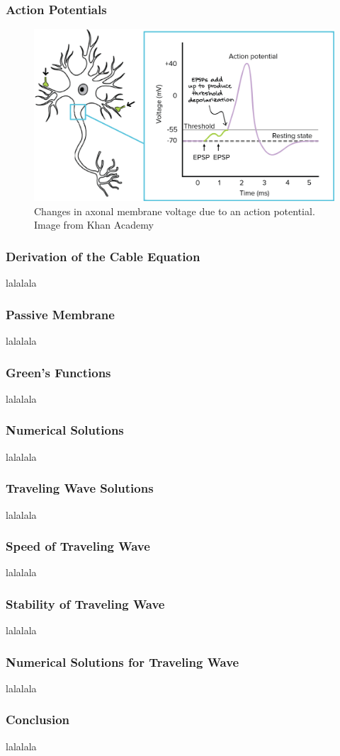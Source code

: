 \documentclass{beamer}
\begin{document}
\begin{frame}
\begin{columns}
\begin{column}{.5\textwidth}
    \end{column}
  \end{columns}
\end{frame}

\begin{frame}
\frametitle{Action Potentials}
\begin{figure}
\includegraphics[width=\textwidth]{actionpotential}
\caption{Changes in axonal membrane voltage due to an action potential. Image from Khan Academy}
\end{figure}
\end{frame}

\begin{frame}
\frametitle{Derivation of the Cable Equation}
lalalala
\end{frame}

\begin{frame}
\frametitle{Passive Membrane}
lalalala
\end{frame}

\begin{frame}
\frametitle{Green's Functions}
lalalala
\end{frame}

\begin{frame}
\frametitle{Numerical Solutions}
lalalala
\end{frame}

\begin{frame}
\frametitle{Traveling Wave Solutions}
lalalala
\end{frame}

\begin{frame}
\frametitle{Speed of Traveling Wave}
lalalala
\end{frame}

\begin{frame}
\frametitle{Stability of Traveling Wave}
lalalala
\end{frame}

\begin{frame}
\frametitle{Numerical Solutions for Traveling Wave}
lalalala
\end{frame}

\begin{frame}
\frametitle{Conclusion}
lalalala
\end{frame}
\end{document}
